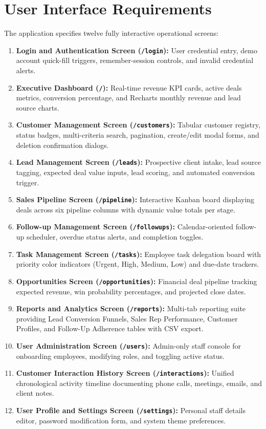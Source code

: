 \section{User Interface Requirements}
The application specifies twelve fully interactive operational screens:
\begin{enumerate}
    \item \textbf{Login and Authentication Screen (\texttt{/login}):} User credential entry, demo account quick-fill triggers, remember-session controls, and invalid credential alerts.
    \item \textbf{Executive Dashboard (\texttt{/}):} Real-time revenue KPI cards, active deals metrics, conversion percentage, and Recharts monthly revenue and lead source charts.
    \item \textbf{Customer Management Screen (\texttt{/customers}):} Tabular customer registry, status badges, multi-criteria search, pagination, create/edit modal forms, and deletion confirmation dialogs.
    \item \textbf{Lead Management Screen (\texttt{/leads}):} Prospective client intake, lead source tagging, expected deal value inputs, lead scoring, and automated conversion trigger.
    \item \textbf{Sales Pipeline Screen (\texttt{/pipeline}):} Interactive Kanban board displaying deals across six pipeline columns with dynamic value totals per stage.
    \item \textbf{Follow-up Management Screen (\texttt{/followups}):} Calendar-oriented follow-up scheduler, overdue status alerts, and completion toggles.
    \item \textbf{Task Management Screen (\texttt{/tasks}):} Employee task delegation board with priority color indicators (Urgent, High, Medium, Low) and due-date trackers.
    \item \textbf{Opportunities Screen (\texttt{/opportunities}):} Financial deal pipeline tracking expected revenue, win probability percentages, and projected close dates.
    \item \textbf{Reports and Analytics Screen (\texttt{/reports}):} Multi-tab reporting suite providing Lead Conversion Funnels, Sales Rep Performance, Customer Profiles, and Follow-Up Adherence tables with CSV export.
    \item \textbf{User Administration Screen (\texttt{/users}):} Admin-only staff console for onboarding employees, modifying roles, and toggling active status.
    \item \textbf{Customer Interaction History Screen (\texttt{/interactions}):} Unified chronological activity timeline documenting phone calls, meetings, emails, and client notes.
    \item \textbf{User Profile and Settings Screen (\texttt{/settings}):} Personal staff details editor, password modification form, and system theme preferences.
\end{enumerate}
